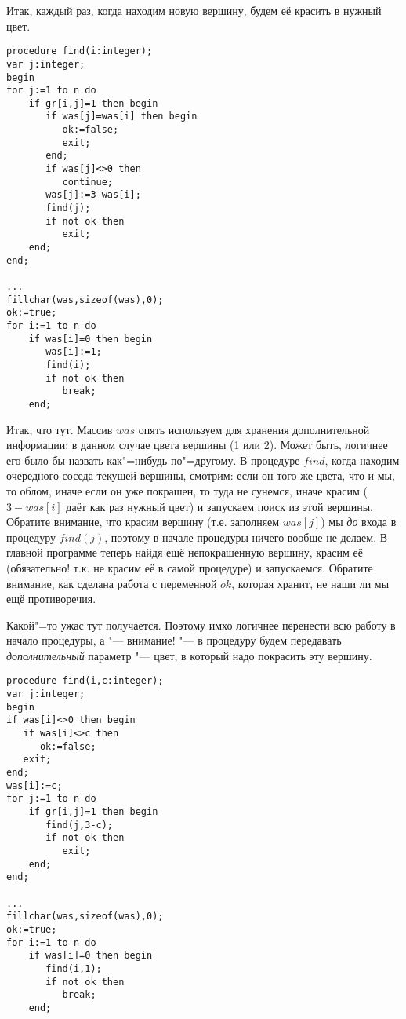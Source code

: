 Итак, каждый раз, когда находим новую вершину, будем её красить в нужный цвет.
\begin{codesample}
\begin{verbatim}
procedure find(i:integer);
var j:integer;
begin
for j:=1 to n do
    if gr[i,j]=1 then begin
       if was[j]=was[i] then begin
          ok:=false;
          exit;
       end;
       if was[j]<>0 then
          continue;
       was[j]:=3-was[i];
       find(j);
       if not ok then
          exit;
    end;
end;

...
fillchar(was,sizeof(was),0);
ok:=true;
for i:=1 to n do
    if was[i]=0 then begin
       was[i]:=1;
       find(i);
       if not ok then
          break;
    end;
\end{verbatim}
\end{codesample}

Итак, что тут. Массив $was$ опять используем для хранения дополнительной информации: в данном 
случае цвета вершины (1 или 2). Может быть, логичнее его было бы назвать как"=нибудь по"=другому.
В процедуре $find$, когда находим очередного соседа текущей вершины, смотрим: если он того же 
цвета, что и мы, то облом, иначе если он уже покрашен, то туда не сунемся, иначе красим ($3-was[i]$ 
даёт как раз нужный цвет) и запускаем поиск из этой вершины. Обратите внимание, что красим вершину 
(т.е. заполняем $was[j]$) мы \textit{до} входа в процедуру $find(j)$, поэтому в начале процедуры 
ничего вообще не делаем. В главной программе теперь найдя ещё непокрашенную вершину, красим её 
(обязательно! т.к. не красим её в самой процедуре) и запускаемся. Обратите внимание, как сделана 
работа с переменной $ok$, которая хранит, не наши ли мы ещё противоречия.

Какой"=то ужас тут получается. Поэтому имхо логичнее перенести всю работу в начало процедуры, а 
"--- внимание! "--- в процедуру будем передавать \textit{дополнительный} параметр "--- цвет, в 
который надо покрасить эту вершину.
\begin{codesample}
\begin{verbatim}
procedure find(i,c:integer);
var j:integer;
begin
if was[i]<>0 then begin
   if was[i]<>c then
      ok:=false;
   exit;
end;
was[i]:=c;
for j:=1 to n do
    if gr[i,j]=1 then begin
       find(j,3-c);
       if not ok then
          exit;
    end;
end;

...
fillchar(was,sizeof(was),0);
ok:=true;
for i:=1 to n do
    if was[i]=0 then begin
       find(i,1);
       if not ok then
          break;
    end;
\end{verbatim}
\end{codesample}

